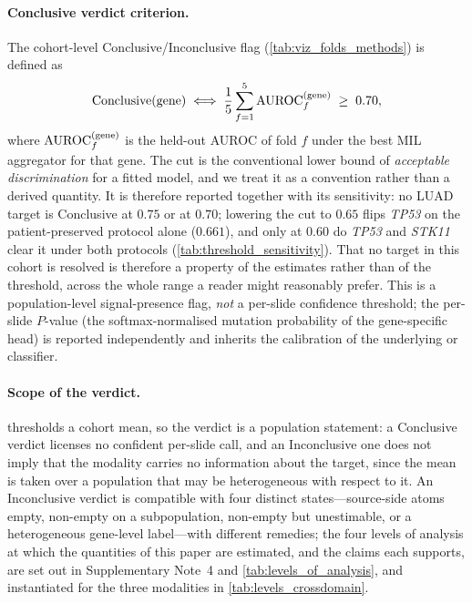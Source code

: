 \paragraph{Conclusive verdict criterion.}
The cohort-level Conclusive/Inconclusive flag
(\cref{tab:viz_folds_methods}) is defined as
\begin{equation}
\mathrm{Conclusive}(\mathrm{gene}) \iff
\frac{1}{5}\sum_{f=1}^{5}\text{AUROC}_{f}^{(\mathrm{gene})} \;\geq\; 0.70,
\label{eq:conclusive_verdict}
\end{equation}
where $\text{AUROC}_f^{(\mathrm{gene})}$ is the held-out AUROC of fold $f$
under the best MIL aggregator for that gene.
The cut is the conventional lower bound of \emph{acceptable discrimination}
for a fitted model,\cite{hosmer2000applied} and we treat it as a convention
rather than a derived quantity. It is therefore reported together with its
sensitivity: no LUAD target is Conclusive at $0.75$ or at $0.70$; lowering the
cut to $0.65$ flips \textit{TP53} on the patient-preserved protocol alone
($0.661$), and only at $0.60$ do \textit{TP53} and \textit{STK11} clear it
under both protocols (\cref{tab:threshold_sensitivity}). That no target in this cohort is
resolved is therefore a property of the estimates rather than of the
threshold, across the whole range a reader might reasonably prefer.
This is a population-level signal-presence flag, \emph{not} a
per-slide confidence threshold; the per-slide $P$-value (the
softmax-normalised mutation probability of the gene-specific head)
is reported independently and inherits the calibration of the
underlying \piabmil{} or \fcmil{} classifier.

\paragraph{Scope of the verdict.}
 thresholds a cohort mean, so the verdict is
a population statement: a Conclusive verdict licenses no confident
per-slide call, and an Inconclusive one does not imply that the modality
carries no information about the target, since the mean is taken over a
population that may be heterogeneous with respect to it. An Inconclusive
verdict is compatible with four distinct states---source-side atoms
empty, non-empty on a subpopulation, non-empty but unestimable, or a
heterogeneous gene-level label---with different remedies; the four
levels of analysis at which the quantities of this paper are estimated,
and the claims each supports, are set out in Supplementary Note~4 and
\cref{tab:levels_of_analysis}, and instantiated for the three modalities
in \cref{tab:levels_crossdomain}.

